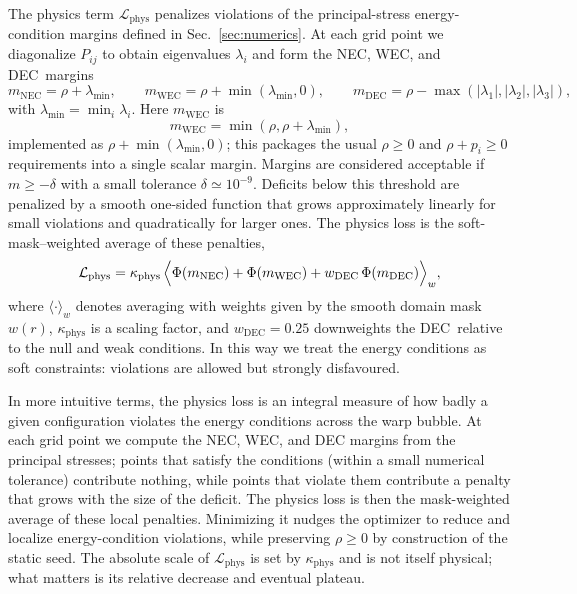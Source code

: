 \documentclass[11pt]{article}
\makeatletter
\newcommand{\@abbr}[1]{\ifmmode\mathrm{#1}\else\textsc{#1}\fi}
\newcommand{\WEC}{\@abbr{WEC}}
\newcommand{\NEC}{\@abbr{NEC}}
\newcommand{\DEC}{\@abbr{DEC}}
\makeatother
\begin{document}
The physics term $\mathcal{L}_\text{phys}$ penalizes violations of the principal-stress energy-condition margins defined in Sec.~\ref{sec:numerics}. At each grid point we diagonalize $P_{ij}$ to obtain eigenvalues $\lambda_i$ and form the \NEC, \WEC, and \DEC\ margins
\begin{equation}
m_\text{NEC} = \rho + \lambda_{\min},\qquad
m_\text{WEC} = \rho + \min(\lambda_{\min},0),\qquad
m_\text{DEC} = \rho - \max(|\lambda_1|,|\lambda_2|,|\lambda_3|),
\end{equation}
with $\lambda_{\min}=\min_i\lambda_i$. Here $m_\text{WEC}$ is
\[
m_\text{WEC} = \min(\rho,\rho+\lambda_{\min}),
\]
implemented as $\rho + \min(\lambda_{\min},0)$; this packages the usual $\rho\ge0$ and $\rho+p_i\ge0$ requirements into a single scalar margin. Margins are considered acceptable if $m\ge -\delta$ with a small tolerance $\delta\simeq10^{-9}$. Deficits below this threshold are penalized by a smooth one-sided function that grows approximately linearly for small violations and quadratically for larger ones. The physics loss is the soft-mask–weighted average of these penalties,
\begin{equation}
\mathcal{L}_\text{phys} = \kappa_\text{phys}\,\Bigl\langle
\Phi(m_\text{NEC}) + \Phi(m_\text{WEC}) + w_\text{DEC}\,\Phi(m_\text{DEC})
\Bigr\rangle_w,
\end{equation}
where $\langle\cdot\rangle_w$ denotes averaging with weights given by the smooth domain mask $w(r)$, $\kappa_\text{phys}$ is a scaling factor, and $w_\text{DEC}=0.25$ downweights the \DEC\ relative to the null and weak conditions. In this way we treat the energy conditions as soft constraints: violations are allowed but strongly disfavoured.

In more intuitive terms, the physics loss is an integral measure of how badly a given configuration violates the energy conditions across the warp bubble. At each grid point we compute the NEC, WEC, and DEC margins from the principal stresses; points that satisfy the conditions (within a small numerical tolerance) contribute nothing, while points that violate them contribute a penalty that grows with the size of the deficit. The physics loss is then the mask-weighted average of these local penalties. Minimizing it nudges the optimizer to reduce and localize energy-condition violations, while preserving $\rho\ge 0$ by construction of the static seed. The absolute scale of $\mathcal{L}_\text{phys}$ is set by $\kappa_\text{phys}$ and is not itself physical; what matters is its relative decrease and eventual plateau.
\end{document}
